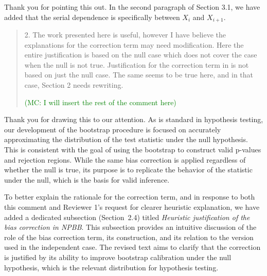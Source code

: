 \documentclass[12pt]{article}
\newcommand{\mc}[1]{\textcolor{green}{(MC: #1)}}
\newenvironment{comment}%
{\begin{quotation}\noindent\small\it\color{darkblue}\ignorespaces%
}{\end{quotation}}
\begin{document}
Thank you for pointing this out. In the second paragraph of Section 3.1, 
we have added that the
serial dependence is specifically between $X_i$ and $X_{i+1}$.




\begin{comment}
2. The work presented here is useful, however I have believe the explanations
for the correction term may need modification. Here the entire justification is
based on the null case which does not cover the case when the null is not true.
Justification for the correction term in \citet{babu2004goodness} is not based 
on just the
null case. The same seems to be true here, and in that case, Section 2 needs
rewriting.

\mc{I will insert the rest of the comment here}
\end{comment}

Thank you for drawing this to our attention. As is standard in hypothesis 
testing, our development of the bootstrap procedure is focused on accurately 
approximating the distribution of the test statistic under the null hypothesis. 
This is consistent with the goal of using the bootstrap to construct valid
 p-values and rejection regions. While the same bias correction is applied 
regardless of whether the null is true, its purpose is to replicate the 
behavior of the statistic under the null, which is the basis for valid inference.


To better explain the rationale for the correction term, and in response to both 
this comment and Reviewer 1’s request for clearer heuristic explanation, we have 
added a dedicated subsection (Section~2.4) titled \emph{Heuristic justification 
of the bias correction in NPBB}. This subsection provides an intuitive discussion 
of the role of the bias correction term, its construction, and its relation to 
the version used in the independent case. The revised text aims to clarify that 
the correction is justified by its ability to improve bootstrap calibration under 
the null hypothesis, which is the relevant distribution for hypothesis testing.







\end{document}
